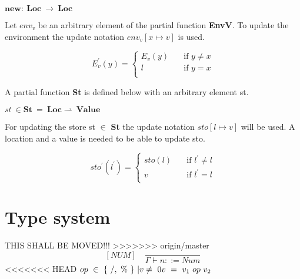   \begin{math}
	  \boldsymbol{new} : \ \boldsymbol{Loc} \ \rightarrow \ \boldsymbol{Loc}
  \end{math}
  
  Let \begin{math}env_v\end{math} be an arbitrary element of the partial function \textbf{EnvV}. To update the environment the update notation \begin{math}env_v [x \mapsto v] \end{math} is used. 
  
  \[ E^{'}_v(y) =
      \begin{cases}
        E_v(y)       & \quad \text{if } y \not= x\\
        l  & \quad \text{if } y = x\\
      \end{cases}
    \]
      
  A partial function \textbf{St} is defined below with an arbitrary element st.
  
  \begin{math}
	  st \ \in \boldsymbol{St} \ = \ \boldsymbol{Loc} \rightharpoonup \ \boldsymbol{Value}
  \end{math}
  
  For updating the store st \begin{math} \in \end{math} \textbf{St} the update notation \begin{math} sto[l \mapsto v] \end{math} will be used. A location and a value is needed to be able to update sto.
  
  \[ sto^{'}(l^{'}) =
    \begin{cases}
      sto(l)       & \quad \text{if } l^{'} \not= l\\
      v  & \quad \text{if } l^{'} = l\\
    \end{cases}
  \]
  
  
  
  
  \section{Type system}
  THIS SHALL BE MOVED!!!
>>>>>>> origin/master
	\[
	[NUM] \quad
	\dfrac{}{\Gamma \vdash n ::= Num}
	\]
<<<<<<< HEAD
	\begin{math}		
		op \ \in \ \{ \ /, \ \% \ \} \ | v \not= \ 0 \newline 		
		v \ = \ v_1 \ op \ v_2		
	\end{math} 
	
